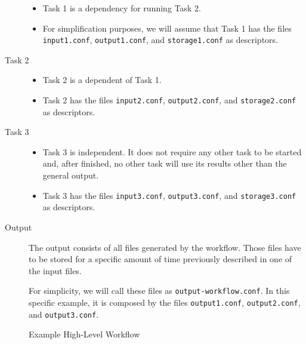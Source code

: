\documentclass[a4paper]{article}
\begin{document}
\begin{description}
\begin{itemize}
\item Task 1 is a dependency for running Task 2.

\item For simplification purposes, we will assume that Task 1 has the files \texttt{input1.conf}, \texttt{output1.conf}, and \texttt{storage1.conf} as descriptors.

\end{itemize}

\item[Task 2]

\begin{itemize}

\item Task 2 is a dependent of Task 1.

\item Task 2 has the files \texttt{input2.conf}, \texttt{output2.conf}, and \texttt{storage2.conf} as descriptors.

\end{itemize}

\item[Task 3]

\begin{itemize}

\item Task 3 is independent. It does not require any other task to be started and, after finished, no other task will use its results other than the general output.

\item Task 3 has the files \texttt{input3.conf}, \texttt{output3.conf}, and \texttt{storage3.conf} as descriptors.

\end{itemize}

\item[Output]

The output consists of all files generated by the workflow. Those files have to be stored for a specific amount of time previously described in one of the input files.

For simplicity, we will call these files as \texttt{output-workflow.conf}. In this specific example, it is composed by the files \texttt{output1.conf}, \texttt{output2.conf}, and \texttt{output3.conf}.

\end{description}

\begin{figure}[b]
  \centering
  \caption{Example High-Level Workflow}
  \label{fig:workflow}
\end{figure}
\end{document}

